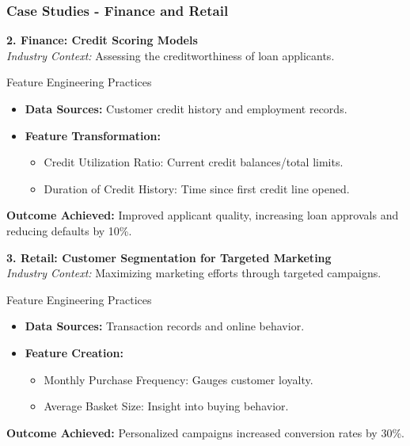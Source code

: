 \documentclass[aspectratio=169]{beamer}
\begin{document}
\begin{frame}[fragile]
    \frametitle{Case Studies - Finance and Retail}
    \textbf{2. Finance: Credit Scoring Models} \\
    \textit{Industry Context:} 
    Assessing the creditworthiness of loan applicants.

    \begin{block}{Feature Engineering Practices}
        \begin{itemize}
            \item \textbf{Data Sources:} Customer credit history and employment records.
            \item \textbf{Feature Transformation:} 
            \begin{itemize}
                \item Credit Utilization Ratio: Current credit balances/total limits.
                \item Duration of Credit History: Time since first credit line opened.
            \end{itemize}
        \end{itemize}
    \end{block}
    
    \textbf{Outcome Achieved:} 
    Improved applicant quality, increasing loan approvals and reducing defaults by 10\%.

    \vspace{0.5cm}

    \textbf{3. Retail: Customer Segmentation for Targeted Marketing} \\
    \textit{Industry Context:} 
    Maximizing marketing efforts through targeted campaigns.

    \begin{block}{Feature Engineering Practices}
        \begin{itemize}
            \item \textbf{Data Sources:} Transaction records and online behavior.
            \item \textbf{Feature Creation:}
            \begin{itemize}
                \item Monthly Purchase Frequency: Gauges customer loyalty.
                \item Average Basket Size: Insight into buying behavior.
            \end{itemize}
        \end{itemize}
    \end{block}
    
    \textbf{Outcome Achieved:} 
    Personalized campaigns increased conversion rates by 30\%.
\end{frame}
\end{document}

